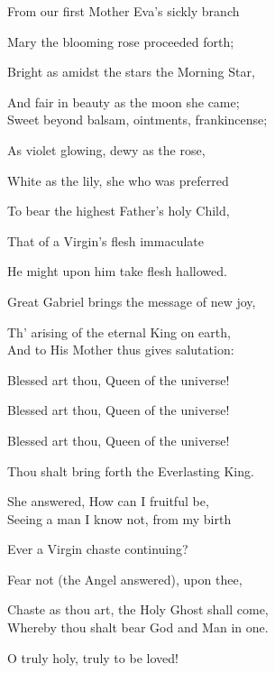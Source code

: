 
\begin{multicols}{2}
From our first Mother Eva's sickly branch

Mary the blooming rose proceeded forth;

Bright as amidst the stars the Morning Star,

And fair in beauty as the moon she came;\\

Sweet beyond balsam, ointments, frankincense;

As violet glowing, dewy as the rose,

White as the lily, she who was preferred

To bear the highest Father's holy Child,

\columnbreak

That of a Virgin's flesh immaculate

He might upon him take flesh hallowed.

Great Gabriel brings the message of new joy,

Th' arising of the eternal King on earth,\\

And to His Mother thus gives salutation:

Blessed art thou, Queen of the universe!

Blessed art thou, Queen of the universe!

Blessed art thou, Queen of the universe!

Thou shalt bring forth the Everlasting King.

She answered, How can I fruitful be,\\

Seeing a man I know not, from my birth

Ever a Virgin chaste continuing?

Fear not (the Angel answered), upon thee,

Chaste as thou art, the Holy Ghost shall come,\\

Whereby thou shalt bear God and Man in one.

O truly holy, truly to be loved!


\end{multicols}
